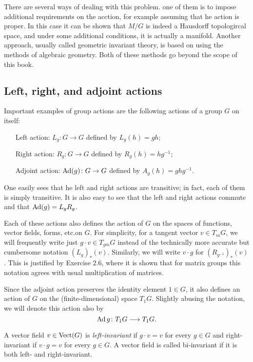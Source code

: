 There are several ways of dealing with this problem. one of them is to
impose additional requirements on the acction, for example assuming that he
action is proper. In this case it can be shown that $M/G$ is indeed a
Hausdorff topologircal space, and under some additional conditions, it is
actually a manifold. Another approach, usually called geometric invariant
theory, is based on using the methods of algebraic geometry. Both of these
methods go beyond the scope of this book.

\subsection{Left, right, and adjoint actions}
Important examples of group actions are the following actions of a group
$G$ on itself:
\begin{itemize}
\item[Left action:] $L_g\colon G\to G$ defined by $L_g(h)=gh$;
\item[Right action:] $R_g\colon G\to G$ defined by $R_g(h)=hg^{-1}$;
\item[Adjoint action:] $\operatorname{Ad}(g)\colon G\to G$ defined by $A_g(h)=ghg^{-1}$.
\end{itemize}

One easily sees that he left and right actions are transitive; in fact,
each of them is simply transitive. It is also easy to see that the left and
right actions commute and that $\operatorname{Ad}(g)=L_gR_g$.

Each of these actions also defines the action of $G$ on the spaces of
functions, vector fields, forms, etc.\@ on $G$. For simplicity, for a
tangent vector $v\in T_mG$, we will frequently write just $g\cdot v\in
T_{gm}G$ instead of the technically more accurate but cumbersome notation
$(L_g)_{*}(v)$. Similarly, we will write $v\cdot g$ for
$(R_{g^{-1}})_*(v)$. This is justified by Exercise 2.6, where it is
shown that for matrix groups this notation agrees with usual multiplication
of matrices.

Since the adjoint action preserves the identity element $1\in G$,  it also
defines an action of $G$ on the (finite-dimensional) space $T_1G$. Slightly
abusing the notation, we will denote this action also by
\[
  \operatorname{Ad} g\colon T_1G\longrightarrow T_1G.
\]

\begin{definition}
  A vector field $v\in\operatorname{Vect}(G)$ is \emph{left-invariant} if
  $g\cdot v=v$ for every $g\in G$ and right-invariant if $v\cdot
  g=v$ for every $g\in G$. A vector field is called bi-invariant if it
  is both left- and right-invariant.
\end{definition}

